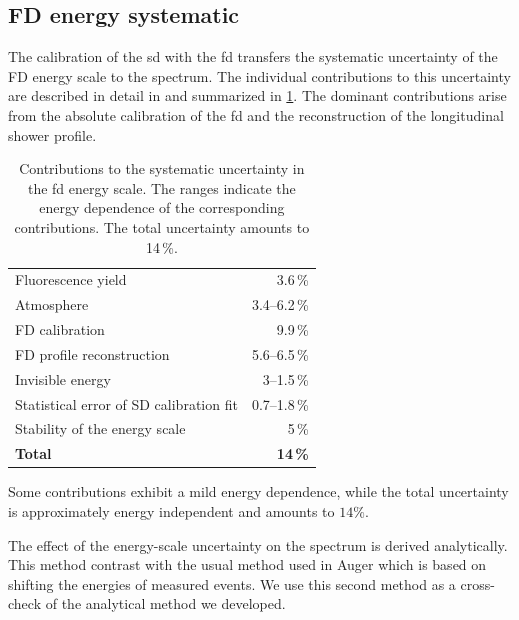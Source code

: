 \documentclass[main.tex]{subfiles}
\begin{document}
\subsection{FD energy systematic}

The calibration of the \gls{sd} with the \gls{fd} transfers the systematic uncertainty of the FD energy scale to the  spectrum.
The individual contributions to this uncertainty are described in detail in \cite{PierreAuger:2015:Observatory} and summarized in \cref{table:energy_scale_systematics}.
The dominant contributions arise from the absolute calibration of the \gls{fd} and the reconstruction of the longitudinal shower profile.

\begin{table}
    \centering
    \caption{Contributions to the systematic uncertainty in the \gls{fd} energy scale.
    The ranges indicate the energy dependence of the corresponding contributions.
    The total uncertainty amounts to 14\,\%.}
    \label{table:energy_scale_systematics}
    \begin{tabular}{lr}
        \hline
        Fluorescence yield
            & 3.6\,\% \\
        Atmosphere
            & 3.4--6.2\,\% \\
        FD calibration
            & 9.9\,\% \\
        FD profile reconstruction
            & 5.6--6.5\,\% \\
        Invisible energy
            & 3--1.5\,\% \\
        Statistical error of SD calibration fit
            & 0.7--1.8\,\% \\
        Stability of the energy scale
            & 5\,\% \\
        \hline
        \textbf{Total}
            & \textbf{14\,\%} \\
        \hline
    \end{tabular}
\end{table}

Some contributions exhibit a mild energy dependence, while the total uncertainty is approximately energy independent and amounts to $14\%$.

The effect of the energy-scale uncertainty on the spectrum is derived analytically. 
This method contrast with the usual method used in Auger which is based on shifting the energies of measured events. 
We use this second method as a cross-check of the analytical method we developed.
\end{document}
